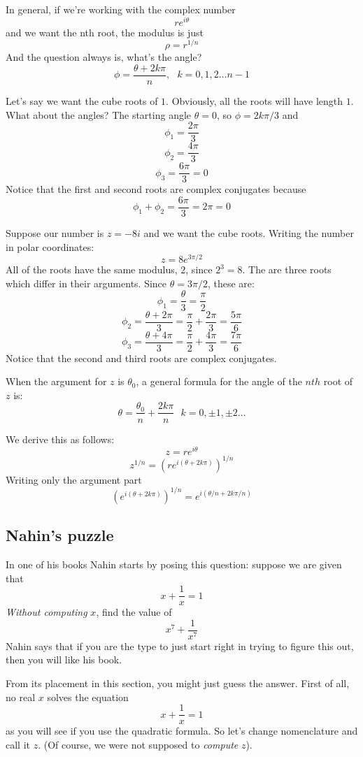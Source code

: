 \documentclass[11pt, oneside]{article}   	%
\begin{document}
In general, if we're working with the complex number
\[ re^{i\theta} \]
and we want the nth root, the modulus is just
\[ \rho = r^{1/n} \]
And the question always is, what's the angle?
\[ \phi = \frac{\theta + 2k\pi}{n}, \ \ \ k = 0, 1, 2 \dots n-1 \]

Let's say we want the cube roots of $1$.  Obviously, all the roots will have length $1$.  What about the angles?  The starting angle $\theta = 0$, so $\phi = 2k\pi/3$ and 
\[ \phi_ 1= \frac{2 \pi}{3} \]
\[ \phi_2 = \frac{4 \pi}{3} \]
\[ \phi_3 = \frac{6 \pi}{3} = 0 \]
Notice that the first and second roots are complex conjugates because
\[ \phi_1 + \phi_2 = \frac{6\pi}{3} = 2 \pi = 0 \]

Suppose our number is $z = -8i$ and we want the cube roots.  Writing the number in polar coordinates:
\[ z = 8e^{3\pi/2} \]
All of the roots have the same modulus, $2$, since $2^3 = 8$.  The are three roots which differ in their arguments.  Since $\theta = 3 \pi / 2$, these are:
\[ \phi_1 = \frac{\theta}{3} = \frac{\pi}{2} \]
\[ \phi_2 = \frac{\theta + 2\pi}{3} = \frac{\pi}{2} + \frac{2\pi}{3} = \frac{5\pi}{6} \]
\[ \phi_3 = \frac{\theta + 4\pi}{3} = \frac{\pi}{2} + \frac{4\pi}{3} = \frac{7\pi}{6} \]
Notice that the second and third roots are complex conjugates.

When the argument for $z$ is $\theta_0$, a general formula for the angle of the $nth$ root of $z$ is:
\[ \theta = \frac{\theta_0}{n} + \frac{2k\pi}{n} \ \ \ k = 0, \pm 1, \pm 2 \dots \]

We derive this as follows:
\[ z = r e^{i \theta} \]
\[ z^{1/n} = (r e^{i (\theta + 2k \pi)} )^{1/n} \]
Writing only the argument part
\[ (e^{i (\theta + 2k \pi)} )^{1/n} = e^{i (\theta/n + 2k \pi/n)}  \]

\subsection*{Nahin's puzzle}
In one of his books Nahin starts by posing this question:  suppose we are given that 
\[ x + \frac{1}{x} = 1 \]
\emph{Without computing} $x$, find the value of
\[ x^7 + \frac{1}{x^7} \]
Nahin says that if you are the type to just start right in trying to figure this out, then you will like his book.

From its placement in this section, you might just guess the answer.  First of all, no real $x$ solves the equation
\[ x + \frac{1}{x} = 1 \]
as you will see if you use the quadratic formula.  So let's change nomenclature and call it $z$.  (Of course, we were not supposed to \emph{compute} $z$).
\end{document}
